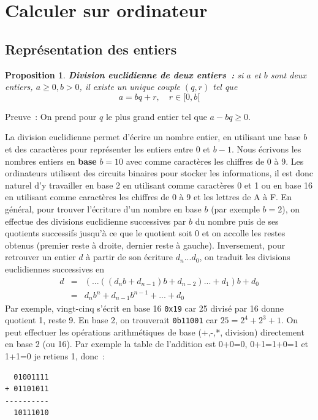 \documentclass[a4paper,11pt]{article}
\newtheorem{prop}[thm]{Proposition}
\begin{document}
\pagebreak

\section{Calculer sur ordinateur} \label{sec:calculer}

\subsection{Représentation des entiers}

\begin{prop}
{\bf Division euclidienne de deux entiers~:} si $a$ et $b$ sont
deux entiers, $a \geq 0, b>0$, il existe un unique couple $(q,r)$ tel que
\[ a = bq +r , \quad r \in [0, b[ \]
\end{prop}
Preuve~: On prend pour $q$ le plus grand entier tel que $a-bq \geq 0$.

La division euclidienne permet d'écrire un nombre entier, en utilisant
une base $b$ et des caractères pour représenter les entiers
entre 0 et $b-1$. Nous \'ecrivons les nombres entiers en {\bf base} $b=10$
avec comme caractères les chiffres de 0 à 9.
Les ordinateurs utilisent des circuits binaires pour stocker
les informations, il est donc naturel d'y travailler en base 2 
en utilisant comme caractères 0 et 1 ou en base 16 en utilisant
comme caractères les chiffres de 0 à 9 et les lettres de A à F.
En g\'en\'eral, pour trouver l'\'ecriture d'un nombre en base $b$ (par
exemple $b=2$), 
on effectue des divisions euclidienne successives par $b$ du nombre puis
de ses quotients successifs jusqu'\`a ce que le quotient soit 0 et on
accolle les restes obtenus (premier reste \`a droite, dernier
reste \`a gauche).
Inversement, pour retrouver un entier $d$ \`a partir
de son \'ecriture $d_n...d_0$, on traduit les divisions euclidiennes 
successives en 
\begin{eqnarray*}
 d &=&( ... ((d_n b +d_{n-1})b + d_{n-2})...+d_1)b+d_0\\
&=& d_n b^n + d_{n-1} b^{n-1} + ... + d_0
\end{eqnarray*}
Par exemple, vingt-cinq s'\'ecrit en base 16 \verb|0x19| car 25 divis\'e
par 16 donne quotient 1, reste 9.
En base 2, on trouverait \verb|0b11001| car $25=2^4+2^3+1$.
On peut effectuer les op\'erations arithm\'etiques de base 
(+,-,*, division) directement en base 2 (ou 16). Par exemple
la table de l'addition est 0+0=0, 0+1=1+0=1 et 1+1=0 je retiens 1,
donc~:
\begin{verbatim}
  01001111
+ 01101011
----------
  10111010
\end{verbatim}
\end{document}
